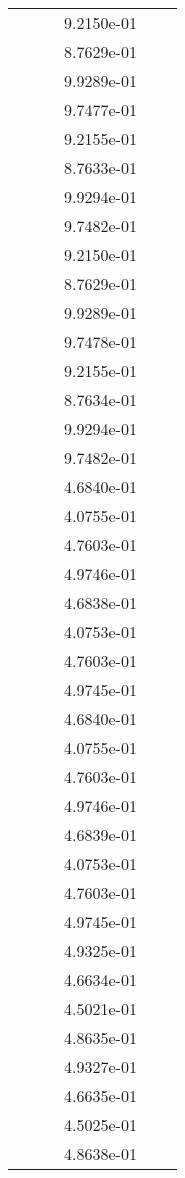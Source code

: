 \begin{xltabular}{\textwidth}{r|rS[table-format=1.3e+2]S[table-format=1.4e+2]S[table-format=1.4e+2]S[table-format=-1.5]}
&  &  & 9.2150e-01 & & \\
&  &  & 8.7629e-01 & & \\
&  &  & 9.9289e-01 & & \\
&  &  & 9.7477e-01 & & \\
&  &  & 9.2155e-01 & & \\
&  &  & 8.7633e-01 & & \\
&  &  & 9.9294e-01 & & \\
&  &  & 9.7482e-01 & & \\
&  &  & 9.2150e-01 & & \\
&  &  & 8.7629e-01 & & \\
&  &  & 9.9289e-01 & & \\
&  &  & 9.7478e-01 & & \\
&  &  & 9.2155e-01 & & \\
&  &  & 8.7634e-01 & & \\
&  &  & 9.9294e-01 & & \\
&  &  & 9.7482e-01 & & \\
&  &  & 4.6840e-01 & & \\
&  &  & 4.0755e-01 & & \\
&  &  & 4.7603e-01 & & \\
&  &  & 4.9746e-01 & & \\
&  &  & 4.6838e-01 & & \\
&  &  & 4.0753e-01 & & \\
&  &  & 4.7603e-01 & & \\
&  &  & 4.9745e-01 & & \\
&  &  & 4.6840e-01 & & \\
&  &  & 4.0755e-01 & & \\
&  &  & 4.7603e-01 & & \\
&  &  & 4.9746e-01 & & \\
&  &  & 4.6839e-01 & & \\
&  &  & 4.0753e-01 & & \\
&  &  & 4.7603e-01 & & \\
&  &  & 4.9745e-01 & & \\
&  &  & 4.9325e-01 & & \\
&  &  & 4.6634e-01 & & \\
&  &  & 4.5021e-01 & & \\
&  &  & 4.8635e-01 & & \\
&  &  & 4.9327e-01 & & \\
&  &  & 4.6635e-01 & & \\
&  &  & 4.5025e-01 & & \\
&  &  & 4.8638e-01 & & \\

\end{xltabular}
